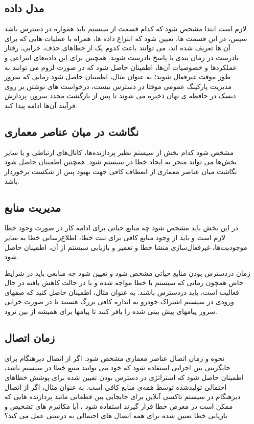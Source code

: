 \subsection{مدل داده}
لازم است ابتدا مشخص شود که کدام قسمت از سیستم باید همواره در دسترس باشد سپس، در این قسمت ها، تعیین شود که انتزاع داده ها، همراه با عملیات هایی که برای آن ها تعریف شده اند، می توانند باعث کدوم یک از خطاهای حذف، خرابی، رفتار نادرست در زمان بندی یا پاسخ نادرست شوند.
همچنین برای این داده‌های انتزاعی و عملکردها و خصوصیات آن‌ها، اطمینان حاصل شود که در صورت لزوم می توانند به طور موقت غیرفعال شوند؛ به عنوان مثال، اطمینان حاصل شود زمانی که سرور مدیریت پارکینگ عمومی موقتا در دسترس نیست، درخواست های نوشتن بر روی دیسک در حافظه ی نهان ذخیره می شوند تا پس از بازگشت مجدد سرور، پردازش فرآیند آن‌ها ادامه پیدا کند.
\subsection{نگاشت در میان عناصر معماری}
مشخص شود کدام بخش از سیستم نظیر پردازنده‌ها، کانال‌های ارتباطی و یا سایر بخش‌ها می تواند منجر به ایجاد خطا در سیستم شود. همچنین اطمینان حاصل شود نگاشت میان عناصر معماری از انعطاف کافی جهت بهبود پس از شکست برخوردار باشد.
\subsection{مدیریت منابع}
در این بخش باید مشخص شود چه منابع حیاتی برای ادامه کار در صورت وجود خطا لازم است و باید از وجود منابع کافی برای ثبت خطا، اطلاع‌رسانی خطا به سایر موجودیت‌ها، غیر‌فعال‌سازی منشا خطا و تعمیر و بازیابی سیستم از آن، اطمینان حاصل شود.

زمان در‌دسترس بودن منابع حیاتی مشخص شود و تعیین شود چه منابعی باید در شرایط خاص همچون زمانی که سیستم با خطا مواجه شده و یا در حالت کاهش یافته در حال فعالیت است، باید در‌دسترس باشند. به عنوان مثال، اطمینان حاصل کنید که صفهای ورودی در سیستم اشتراک خودرو به اندازه کافی بزرگ هستند تا در صورت خرابی سرور پیامهای پیش بینی شده را بافر کنند تا پیامها برای همیشه از بین نرود.
\subsection{زمان اتصال}
نحوه و زمان اتصال عناصر معماری مشخص شود. اگر از اتصال دیرهنگام برای جایگزینی بین اجزایی استفاده شود که خود می توانند منبع خطا در سیستم باشد، اطمینان حاصل شود که استراتژی در دسترس بودن تعیین شده برای پوشش خطاهای احتمالی تولید‌شده توسط همه‌ی منابع کافی است. به عنوان مثال، اگر از اتصال دیرهنگام در سیستم تاکسی آنلاین برای جابجایی بین قطعاتی مانند پردازنده هایی که ممکن است در معرض خطا قرار گیرند استفاده شود ، آیا مکانیزم های تشخیص و بازیابی خطا تعیین شده برای همه اتصال های احتمالی به درستی عمل می کند؟
